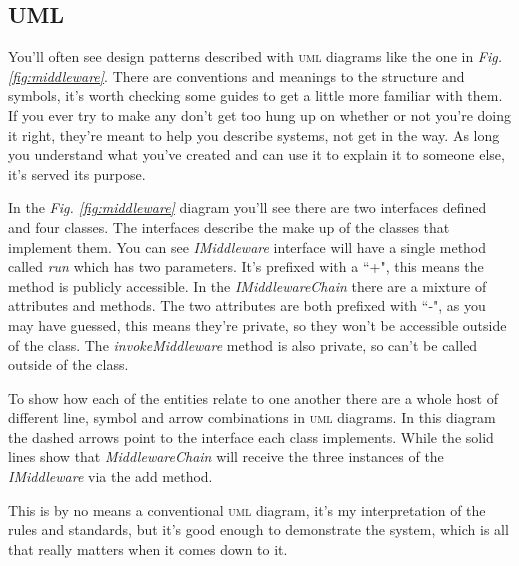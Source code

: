 \documentclass[12pt]{article}
\newcommand{\umlref}[1]{\textit{Fig. \ref{#1}}}
\begin{document}
\subsection{UML}
You'll often see design patterns described with \textsc{uml} diagrams like the one in \umlref{fig:middleware}. There are conventions and meanings to the structure and symbols, it's worth checking some guides to get a little more familiar with them. If you ever try to make any don't get too hung up on whether or not you're doing it right, they're meant to help you describe systems, not get in the way. As long you understand what you've created and can use it to explain it to someone else, it's served its purpose.
\par In the \umlref{fig:middleware} diagram you'll see there are two interfaces defined and four classes. The interfaces describe the make up of the classes that implement them. You can see \textit{IMiddleware} interface will have a single method called \textit{run} which has two parameters. It's prefixed with a ``+", this means the method is publicly accessible. In the \textit{IMiddlewareChain} there are a mixture of attributes and methods. The two attributes are both prefixed with ``-", as you may have guessed, this means they're private, so they won't be accessible outside of the class. The \textit{invokeMiddleware} method is also private, so can't be called outside of the class.
\par To show how each of the entities relate to one another there are a whole host of different line, symbol and arrow combinations in \textsc{uml} diagrams. In this diagram the dashed arrows point to the interface each class implements. While the solid lines show that \textit{MiddlewareChain} will receive the three instances of the \textit{IMiddleware} via the add method. 
\par This is by no means a conventional \textsc{uml} diagram, it's my interpretation of the rules and standards, but it's good enough to demonstrate the system, which is all that really matters when it comes down to it. 
\end{document}
